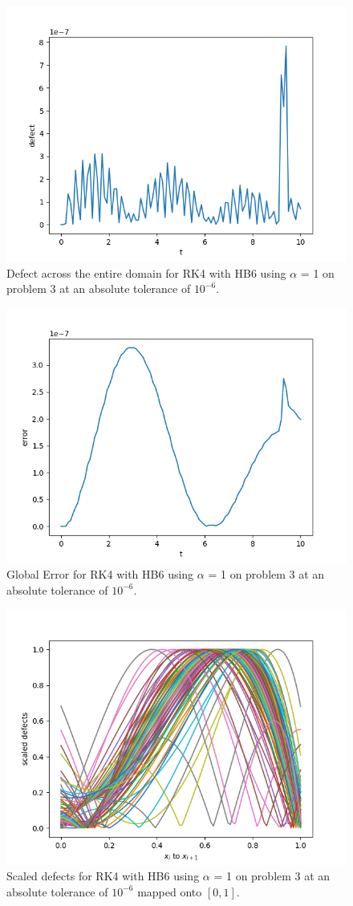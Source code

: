 \begin{figure}[H]
\centering
\includegraphics[width=0.7\linewidth]{./figures/static_alpha_rk4_with_hb6_p3_global_defect}
\caption{Defect across the entire domain for RK4 with HB6 using $\alpha$ = 1 on problem 3 at an absolute tolerance of $10^{-6}$.}
\label{fig:static_alpha_rk4_with_hb6_p3_global_defect}
\end{figure}

\begin{figure}[H]
\centering
\includegraphics[width=0.7\linewidth]{./figures/static_alpha_rk4_with_hb6_p3_global_error}
\caption{Global Error for RK4 with HB6 using $\alpha$ = 1 on problem 3 at an absolute tolerance of $10^{-6}$.}
\label{fig:static_alpha_rk4_with_hb6_p3_global_error}
\end{figure}

\begin{figure}[H]
\centering
\includegraphics[width=0.7\linewidth]{./figures/static_alpha_rk4_with_hb6_p3_scaled_defects}
\caption{Scaled defects for RK4 with HB6 using $\alpha$ = 1 on problem 3 at an absolute tolerance of $10^{-6}$ mapped onto $[0, 1]$.}
\label{fig:static_alpha_rk4_with_hb6_p3_scaled_defects}
\end{figure}

